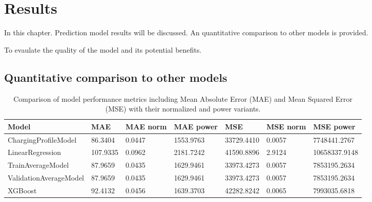 \setchapterpreamble[u]{\margintoc}

\setchapterpreamble[u]{\margintoc}
\chapter{Results}
\label{ch:results}



In this chapter. Prediction model results will be discussed. An quantitative comparison to other models is provided.

To evaulate the quality of the model and its potential benefits.

\section{Quantitative comparison to other models}
\label{sec:res-comparison}


\begin{table*}[h!]
    \caption{Comparison of model performance metrics including Mean Absolute Error (MAE) and Mean Squared Error (MSE) with their normalized and power variants.}
    \label{tab:my-table}
    \begin{tabular}{p{3.3cm} p{1.5cm} p{1.8cm} p{2.2cm} p{1.5cm} p{1.8cm} p{2.2cm}}
        \toprule
        \textbf{Model}         & \textbf{MAE} & \textbf{MAE norm} & \textbf{MAE power} & \textbf{MSE} & \textbf{MSE norm} & \textbf{MSE power} \\
        \midrule
        ChargingProfileModel   & 86.3404      & 0.0447            & 1553.9763          & 33729.4410   & 0.0057            & 7748441.2767       \\
        LinearRegression       & 107.9335     & 0.0962            & 2181.7242          & 41590.8896   & 2.9124            & 10658337.9148      \\
        TrainAverageModel      & 87.9659      & 0.0435            & 1629.9461          & 33973.4273   & 0.0057            & 7853195.2634       \\
        ValidationAverageModel & 87.9659      & 0.0435            & 1629.9461          & 33973.4273   & 0.0057            & 7853195.2634       \\
        XGBoost                & 92.4132      & 0.0456            & 1639.3703          & 42282.8242   & 0.0065            & 7993035.6818       \\
        \bottomrule
    \end{tabular}
\end{table*}
